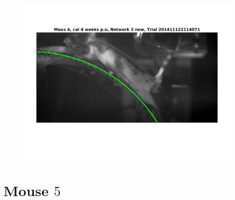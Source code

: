 \documentclass[
	fontsize=12pt,
	paper=a4,
	twoside=false,
	numbers=noenddot,
	plainheadsepline,
	toc=listof,
	toc=bibliography
]{scrartcl}
\begin{document}
\begin{figure} [htb] \centering
	\includegraphics[scale = 0.6]{images/mouse4/result_Maus_4_cal_4_weeks_Network_3_new.png}
\end{figure}

\FloatBarrier

\section*{Mouse $5$}








\end{document}
